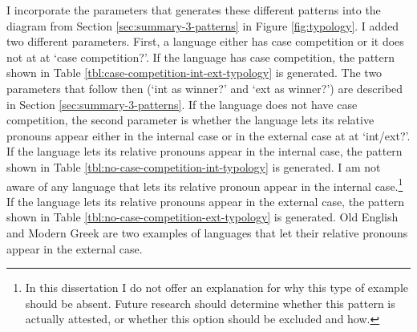 I incorporate the parameters that generates these different patterns into the diagram from Section \ref{sec:summary-3-patterns} in Figure \ref{fig:typology}.
I added two different parameters. First, a language either has case competition or it does not at at `case competition?'. If the language has case competition, the pattern shown in Table \ref{tbl:case-competition-int-ext-typology} is generated. The two parameters that follow then (`\ac{int} as winner?' and `\ac{ext} as winner?') are described in Section \ref{sec:summary-3-patterns}.
If the language does not have case competition, the second parameter is whether the language lets its relative pronouns appear either in the internal case or in the external case at at `\ac{int}/\ac{ext}?'.
If the language lets its relative pronouns appear in the internal case, the pattern shown in Table \ref{tbl:no-case-competition-int-typology} is generated. I am not aware of any language that lets its relative pronoun appear in the internal case.\footnote{
In this dissertation I do not offer an explanation for why this type of example should be absent. Future research should determine whether this pattern is actually attested, or whether this option should be excluded and how.
}
If the language lets its relative pronouns appear in the external case, the pattern shown in Table \ref{tbl:no-case-competition-ext-typology} is generated. Old English and Modern Greek are two examples of languages that let their relative pronouns appear in the external case.

